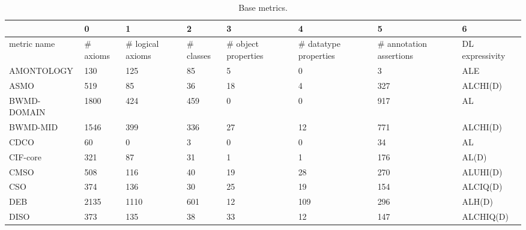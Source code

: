 \begin{table}
\centering
\caption{Base metrics.}
\label{tab:base-metrics}
\begin{tabular}{m{3.5cm}m{1cm}m{1cm}m{1cm}m{1cm}m{1cm}m{1cm}m{1cm}}
\toprule
{} &         0 &                 1 &          2 &                    3 &                      4 &                        5 &                6 \\
\midrule
metric name                 &  \# axioms &  \# logical axioms &  \# classes &  \# object properties &  \# datatype properties &  \# annotation assertions &  DL expressivity \\
AMONTOLOGY                  &       130 &               125 &         85 &                    5 &                      0 &                        3 &              ALE \\
ASMO                        &       519 &                85 &         36 &                   18 &                      4 &                      327 &         ALCHI(D) \\
BWMD-DOMAIN                 &      1800 &               424 &        459 &                    0 &                      0 &                      917 &               AL \\
BWMD-MID                    &      1546 &               399 &        336 &                   27 &                     12 &                      771 &         ALCHI(D) \\
CDCO                        &        60 &                 0 &          3 &                    0 &                      0 &                       34 &               AL \\
CIF-core                    &       321 &                87 &         31 &                    1 &                      1 &                      176 &            AL(D) \\
CMSO                        &       508 &               116 &         40 &                   19 &                     28 &                      270 &         ALUHI(D) \\
CSO                         &       374 &               136 &         30 &                   25 &                     19 &                      154 &         ALCIQ(D) \\
DEB                         &      2135 &              1110 &        601 &                   12 &                    109 &                      296 &           ALH(D) \\
DISO                        &       373 &               135 &         38 &                   33 &                     12 &                      147 &        ALCHIQ(D) \\

\end{tabular}
\end{table}
